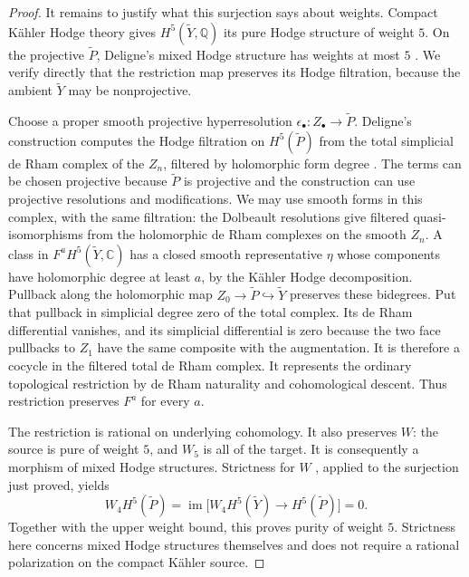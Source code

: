 \documentclass[11pt]{amsart}
\theoremstyle{definition}
\theoremstyle{remark}
\numberwithin{equation}{section}
\newcommand{\Q}{\mathbb{Q}}
\newcommand{\C}{\mathbb{C}}
\DeclareMathOperator{\im}{im}
\begin{document}
\begin{proof}
It remains to justify what this surjection says about weights.
Compact K\"ahler Hodge theory gives $H^5(\widetilde Y,\Q)$ its pure
Hodge structure of weight $5$.  On the projective $\widetilde P$,
Deligne's mixed Hodge structure has weights at most $5$
\cite[Theorem~8.2.4(iii)]{DeligneHodgeIII}.  We verify directly that
the restriction map preserves its Hodge filtration, because the
ambient $\widetilde Y$ may be nonprojective.

Choose a proper smooth projective hyperresolution
$\epsilon_\bullet\colon Z_\bullet\to\widetilde P$.  Deligne's
construction computes the Hodge filtration on $H^5(\widetilde P)$
from the total simplicial de Rham complex of the $Z_n$, filtered by
holomorphic form degree
\cite[Section~8.1, (8.2.1), and Proposition~8.2.2]{DeligneHodgeIII}.
The terms can be chosen projective because $\widetilde P$ is projective
and the construction can use projective resolutions and modifications.
We may use smooth forms in this complex, with the same filtration:
the Dolbeault resolutions give filtered quasi-isomorphisms from the
holomorphic de Rham complexes on the smooth $Z_n$.
A class in $F^aH^5(\widetilde Y,\C)$ has a closed smooth representative
$\eta$ whose components have holomorphic degree at least $a$, by the
K\"ahler Hodge decomposition.  Pullback along the holomorphic map
$Z_0\to\widetilde P\hookrightarrow\widetilde Y$ preserves these
bidegrees.  Put that pullback in simplicial degree zero of the total
complex.  Its de Rham differential vanishes, and its simplicial
differential is zero because the two face pullbacks to $Z_1$ have the
same composite with the augmentation.  It is therefore a cocycle in
the filtered total de Rham complex.  It represents the ordinary
topological restriction by de Rham
naturality and cohomological descent.  Thus restriction preserves
$F^a$ for every $a$.

The restriction is rational on underlying cohomology.  It also
preserves $W$: the source is pure of weight $5$, and $W_5$ is all of
the target.  It is consequently a morphism of mixed Hodge structures.
Strictness for $W$ \cite[Theorem~2.3.5(iii)]{DeligneHodgeII}, applied
to the surjection just proved, yields
\[
 W_4H^5(\widetilde P)
     =\im\bigl[W_4H^5(\widetilde Y)\to H^5(\widetilde P)\bigr]=0.
\]
Together with the upper weight bound, this proves purity of weight
$5$.  Strictness here concerns mixed Hodge structures themselves and
does not require a rational polarization on the compact K\"ahler
source.
\end{proof}
\end{document}

